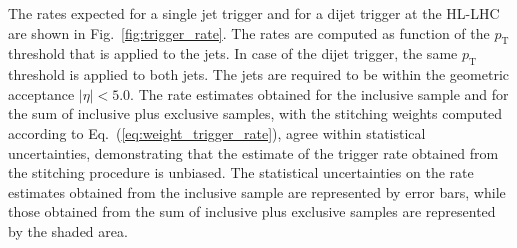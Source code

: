 \documentclass[twocolumn,epjc3]{svjour3}
\newcommand{\pT}{\ensuremath{p_{\textrm{T}}}\xspace}
\begin{document}
The rates expected for a single jet trigger and for a dijet trigger at the HL-LHC are shown in Fig.~\ref{fig:trigger_rate}.
The rates are computed as function of the $\pT$ threshold that is applied to the jets. 
In case of the dijet trigger, the same $\pT$ threshold is applied to both jets.
The jets are required to be within the geometric acceptance $\vert\eta\vert < 5.0$.
The rate estimates obtained for the inclusive sample and for the sum of inclusive plus exclusive samples, 
with the stitching weights computed according to Eq.~(\ref{eq:weight_trigger_rate}),
agree within statistical uncertainties, demonstrating that the estimate of the trigger rate obtained from the stitching procedure is unbiased.
The statistical uncertainties on the rate estimates obtained from the inclusive sample are represented by error bars,
while those obtained from the sum of inclusive plus exclusive samples are represented by the shaded area.
\end{document}
